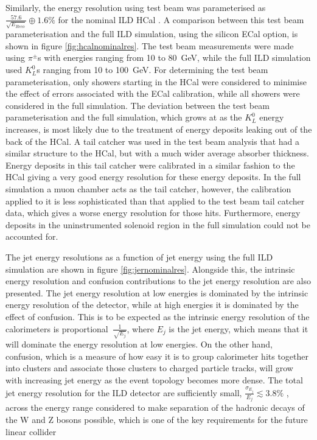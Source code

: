 Similarly, the energy resolution using test beam was parameterised as $\frac{57.6}{\sqrt{E_{Reco}}} \oplus 1.6 \%$ for the nominal ILD HCal \cite{Adloff:2012gv}.  A comparison between this test beam parameterisation and the full ILD simulation, using the silicon ECal option, is shown in figure \ref{fig:hcalnominalres}.  The test beam measurements were made using $\pi^{\pm}$s with energies ranging from 10 to 80~GeV, while the full ILD simulation used $K^{0}_{L}$s ranging from 10 to 100~GeV.  For determining the test beam parameterisation, only showers starting in the HCal were considered to minimise the effect of errors associated with the ECal calibration, while all showers were considered in the full simulation.  The deviation between the test beam parameterisation and the full simulation, which grows at as the $K^{0}_{L}$ energy increases, is most likely due to the treatment of energy deposits leaking out of the back of the HCal.  A tail catcher was used in the test beam analysis that had a similar structure to the HCal, but with a much wider average absorber thickness.  Energy deposits in this tail catcher were calibrated in a similar fashion to the HCal giving a very good energy resolution for these energy deposits.  In the full simulation a muon chamber acts as the tail catcher, however, the calibration applied to it is less sophisticated than that applied to the test beam tail catcher data, which gives a worse energy resolution for those hits.  Furthermore, energy deposits in the uninstrumented solenoid region in the full simulation could not be accounted for.  

The jet energy resolutions as a function of jet energy using the full ILD simulation are shown in figure \ref{fig:jernominalres}.  Alongside this, the intrinsic energy resolution and confusion contributions to the jet energy resolution are also presented.  The jet energy resolution at low energies is dominated by the intrinsic energy resolution of the detector, while at high energies it is dominated by the effect of confusion.  This is to be expected as the intrinsic energy resolution of the calorimeters is proportional $~\frac{1}{\sqrt{E_{j}}}$, where $E_{j}$ is the jet energy, which means that it will dominate the energy resolution at low energies.  On the other hand, confusion, which is a measure of how easy it is to group calorimeter hits together into clusters and associate those clusters to charged particle tracks, will grow with increasing jet energy as the event topology becomes more dense.  The total jet energy resolution for the ILD detector are sufficiently small, $\frac{\sigma_{E_{j}}}{E_{j}} \lesssim 3.8\%$ \cite{Behnke:2013lya, arXiv:0907.3577, Linssen:2012hp}, across the energy range considered to make separation of the hadronic decays of the W and Z bosons possible, which is one of the key requirements for the future linear collider

